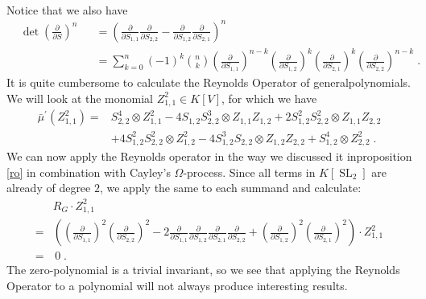 \begin{example}
\begin{equation*}
\begin{aligned}
    \end{aligned}
  \end{equation*}
  Notice that we also have
  \begin{equation*}
    \begin{aligned}
      &\operatorname{det}\left( \frac{\partial}{\partial S} \right)^n
      &&= \left( \frac{\partial}{\partial S_{1,1}} \frac{\partial}{\partial S_{2,2}} - \frac{\partial}{\partial S_{1,2}} \frac{\partial}{\partial S_{2,1}} \right)^n \\
      &&&= \sum_{k=0}^n (-1)^k \binom{n}{k} \left(\frac{\partial}{\partial S_{1,1}}\right)^{n-k} \left(\frac{\partial}{\partial S_{1,2}}\right)^k \left(\frac{\partial}{\partial S_{2,1}}\right)^k \left(\frac{\partial}{\partial S_{2,2}}\right)^{n-k} \; .
    \end{aligned}
  \end{equation*}
  It is quite cumbersome to calculate the Reynolds Operator of general\linebreak polynomials.
  We will look at the monomial $Z_{1,1}^2 \in K[V]$, for which we have
  \begin{equation*}
    \begin{aligned}
      \bar{\mu}^\prime (Z_{1,1}^2) 
      = &S_{2,2}^4 \otimes Z_{1,1}^2 - 4S_{1,2}S_{2,2}^3 \otimes Z_{1,1}Z_{1,2} + 2S_{1,2}^2 S_{2,2}^2 \otimes Z_{1,1}Z_{2,2} \\
      & + 4S_{1,2}^2 S_{2,2}^2 \otimes Z_{1,2}^2 - 4S_{1,2}^3 S_{2,2} \otimes Z_{1,2}Z_{2,2} + S_{1,2}^4 \otimes Z_{2,2}^2 \; .
    \end{aligned}
  \end{equation*}
  We can now apply the Reynolds operator in the way we discussed it in\linebreak proposition \ref{ro} in combination with Cayley's $\Omega$-process.
  Since all terms in $K[\operatorname{SL}_2]$ are already of degree $2$, we apply the same to each summand and calculate:
  \begin{equation*}
    \begin{aligned}
      & R_G \cdot Z_{1,1}^2 \\
      =& \left(\left( \frac{\partial}{\partial S_{1,1}}\right)^2 \left(\frac{\partial}{\partial S_{2,2}}\right)^2 - 2 \frac{\partial}{\partial S_{1,1}} \frac{\partial}{\partial S_{1,2}} \frac{\partial}{\partial S_{2,1}} \frac{\partial}{\partial S_{2,2}} + \left(\frac{\partial}{\partial S_{1,2}}\right)^2\left(\frac{\partial}{\partial S_{2,1}}\right)^2 \right) \cdot Z_{1,1}^2 \\
      =& \, 0 \; .
    \end{aligned}
  \end{equation*}
  The zero-polynomial is a trivial invariant, so we see that applying the Reynolds Operator to a polynomial will not always produce interesting results.
  

\end{example}
